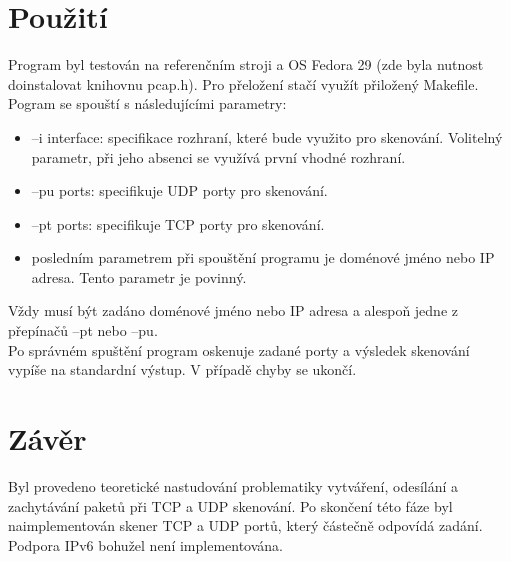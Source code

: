 \documentclass[a4paper, 11pt]{article}
\begin{document}
\section{Použití}
Program byl testován na referenčním stroji a OS Fedora 29 (zde byla nutnost doinstalovat knihovnu pcap.h). Pro přeložení stačí využít přiložený Makefile.\\
Pogram se spouští s následujícími parametry:
\begin{itemize}
	\item --i interface: specifikace rozhraní, které bude využito pro skenování. Volitelný parametr, při jeho absenci se využívá první vhodné rozhraní. 
	\item --pu ports: specifikuje UDP porty pro skenování. 
	\item --pt ports: specifikuje TCP porty pro skenování.
	\item posledním parametrem při spouštění programu je doménové jméno nebo IP adresa. Tento parametr je povinný. 
\end{itemize}
Vždy musí být zadáno doménové jméno nebo IP adresa a alespoň jedne z přepínačů --pt nebo --pu.\\ 
Po správném spuštění program oskenuje zadané porty a výsledek skenování vypíše na standardní výstup. V případě chyby se ukončí.
\section{Závěr}
Byl provedeno teoretické nastudování problematiky vytváření, odesílání a zachytávání paketů při TCP a UDP skenování. Po skončení této fáze byl naimplementován skener TCP a UDP portů, který částečně odpovídá zadání. Podpora IPv6 bohužel není implementována.\\
\newpage %

\def\refname{Použité zdroje}

 
\end{document}
